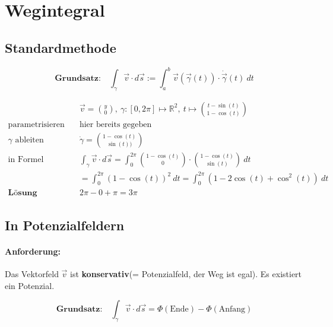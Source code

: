 \documentclass[11pt]{article}
\begin{document}
\section{Wegintegral}

\subsection{Standardmethode}

\begin{equation*}
	\textbf{Grundsatz:}\quad \int_\gamma \vec{v}\cdot d\vec{s} := \int_a^b \vec{v}(\vec{\gamma}(t)) \cdot \dot\vec{\gamma}(t)\ dt
\end{equation*}

\begin{equation*}
\begin{split}
	& \vec{v} = \binom{y}{0},\ \gamma:[0, 2\pi] \mapsto \mathbb{R}^2,\ t \mapsto \binom{t -\sin(t)}{1-\cos(t)} \\
	\text{parametrisieren}\quad & \text{hier bereits gegeben} \\
	\text{$\gamma$ ableiten}\quad & \dot\gamma = \binom{1-\cos(t)}{\sin(t))} \\
	\text{in Formel einsetzen}\quad & \int_\gamma \vec{v} \cdot d\vec{s} = \int_0^{2\pi} \binom{1-\cos(t)}{0}\cdot\binom{1-\cos(t)}{\sin(t)}\ dt \\
	&= \int_0^{2\pi} (1-\cos(t))^2\ dt = \int_0^{2\pi} (1-2\cos(t)+\cos^2(t))\ dt \\
	\textbf{L{\"o}sung}\quad & 2\pi - 0 + \pi = 3\pi
\end{split}
\end{equation*}

\clearpage

\subsection{In Potenzialfeldern}

\paragraph{Anforderung:} Das Vektorfeld $\vec{v}$ ist \textbf{konservativ}(= Potenzialfeld, der Weg ist egal). Es existiert ein Potenzial.

\begin{equation*}
	\textbf{Grundsatz:}\quad\int_\gamma \vec{v} \cdot d\vec{s} = \Phi(\text{Ende}) - \Phi(\text{Anfang})
\end{equation*}
\end{document}
